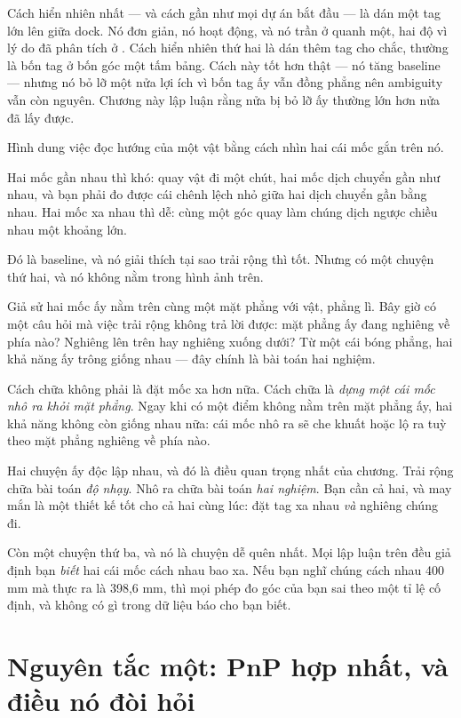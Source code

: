 \documentclass[../../marker.tex]{subfiles}
\begin{document}
Cách hiển nhiên nhất --- và cách gần như mọi dự án bắt đầu --- là dán một tag lớn lên giữa dock. Nó đơn giản, nó hoạt động, và nó trần ở quanh một, hai độ vì lý do đã phân tích ở . Cách hiển nhiên thứ hai là dán thêm tag cho chắc, thường là bốn tag ở bốn góc một tấm bảng. Cách này tốt hơn thật --- nó tăng baseline --- nhưng nó bỏ lỡ một nửa lợi ích vì bốn tag ấy vẫn đồng phẳng nên ambiguity vẫn còn nguyên. Chương này lập luận rằng nửa bị bỏ lỡ ấy thường lớn hơn nửa đã lấy được.

\begin{trucgiac}
Hình dung việc đọc hướng của một vật bằng cách nhìn hai cái mốc gắn trên nó.

Hai mốc gần nhau thì khó: quay vật đi một chút, hai mốc dịch chuyển gần như nhau, và bạn phải đo được cái chênh lệch nhỏ giữa hai dịch chuyển gần bằng nhau. Hai mốc xa nhau thì dễ: cùng một góc quay làm chúng dịch ngược chiều nhau một khoảng lớn.

Đó là baseline, và nó giải thích tại sao trải rộng thì tốt. Nhưng có một chuyện thứ hai, và nó không nằm trong hình ảnh trên.

Giả sử hai mốc ấy nằm trên cùng một mặt phẳng với vật, phẳng lì. Bây giờ có một câu hỏi mà việc trải rộng không trả lời được: mặt phẳng ấy đang nghiêng về phía nào? Nghiêng lên trên hay nghiêng xuống dưới? Từ một cái bóng phẳng, hai khả năng ấy trông giống nhau --- đây chính là bài toán hai nghiệm.

Cách chữa không phải là đặt mốc xa hơn nữa. Cách chữa là \emph{dựng một cái mốc nhô ra khỏi mặt phẳng}. Ngay khi có một điểm không nằm trên mặt phẳng ấy, hai khả năng không còn giống nhau nữa: cái mốc nhô ra sẽ che khuất hoặc lộ ra tuỳ theo mặt phẳng nghiêng về phía nào.

Hai chuyện ấy độc lập nhau, và đó là điều quan trọng nhất của chương. Trải rộng chữa bài toán \emph{độ nhạy}. Nhô ra chữa bài toán \emph{hai nghiệm}. Bạn cần cả hai, và may mắn là một thiết kế tốt cho cả hai cùng lúc: đặt tag xa nhau \emph{và} nghiêng chúng đi.

Còn một chuyện thứ ba, và nó là chuyện dễ quên nhất. Mọi lập luận trên đều giả định bạn \emph{biết} hai cái mốc cách nhau bao xa. Nếu bạn nghĩ chúng cách nhau 400 mm mà thực ra là 398,6 mm, thì mọi phép đo góc của bạn sai theo một tỉ lệ cố định, và không có gì trong dữ liệu báo cho bạn biết.
\end{trucgiac}

\section{Nguyên tắc một: PnP hợp nhất, và điều nó đòi hỏi}
\end{document}
